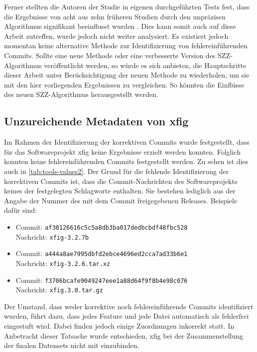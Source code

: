 Ferner stellten die Autoren der Studie in eigenen durchgeführten Tests fest, dass die Ergebnisse von acht aus zehn früheren Studien durch den unpräzisen Algorithmus signifikant beeinflusst wurden \cite{Wen2019}. Dies kann somit auch auf diese Arbeit zutreffen, wurde jedoch nicht weiter analysiert. Es existiert jedoch momentan keine alternative Methode zur Identifizierung von fehlereinführenden Commits. Sollte eine neue Methode oder eine verbesserte Version des SZZ-Algorithmus veröffentlicht werden, so würde es sich anbieten, die Hauptschritte dieser Arbeit unter Berücksichtigung der neuen Methode zu wiederholen, um sie mit den hier vorliegenden Ergebnissen zu vergleichen. So könnten die Einflüsse des neuen SZZ-Algorithmus herausgestellt werden.

\subsection*{Unzureichende Metadaten von xfig}
\label{xfig}
Im Rahmen der Identifizierung der korrektiven Commits wurde festgestellt, dass für das Softwareprojekt \glqq xfig\grqq{} keine Ergebnisse erzielt werden konnten. Folglich konnten keine fehlereinführenden Commits festgestellt werden. Zu sehen ist dies auch in \autoref{tab:tools-values2}. Der Grund für die fehlende Identifizierung der korrektiven Commits ist, dass die Commit-Nachrichten des Softwareprojekts keines der festgelegten Schlagworte enthalten. Sie bestehen lediglich aus der Angabe der Nummer des mit dem Commit freigegebenen Releases. Beispiele dafür sind:

\begin{itemize}
\setlength{\itemsep}{-2pt}
\item Commit: \texttt{af30126616c5c5a8db3ba017dedbcbdf48fbc528}\\Nachricht: \texttt{xfig-3.2.7b}
\item Commit: \texttt{a444a8ae7995dbfd2ebce4696ed2cca7ad33b6e1}\\Nachricht: \texttt{xfig-3.2.6.tar.xz}
\item Commit: \texttt{f3706bcafe9049247eee1a88d64f9f8b4e98c076}\\Nachricht: \texttt{xfig.3.0.tar.gz}
\end{itemize}

Der Umstand, dass weder korrektive noch fehlereinführende Commits identifiziert wurden, führt dazu, dass jedes Feature und jede Datei automatisch als \glqq fehlerfrei\grqq{} eingestuft wird. Dabei finden jedoch einige Zuordnungen inkorrekt statt. In Anbetracht dieser Tatsache wurde entschieden, \glqq xfig\grqq{} bei der Zusammenstellung der finalen Datensets nicht mit einzubinden.

